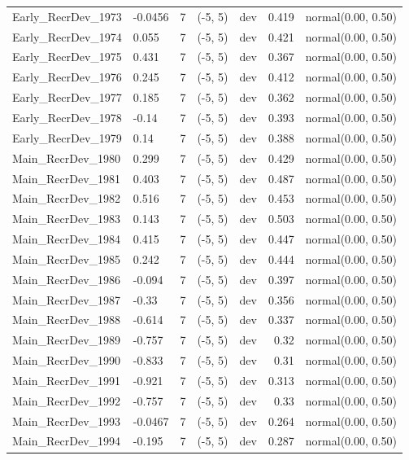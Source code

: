\documentclass[
  english,
]{article}
\begin{document}
\begin{landscape}
\begin{longtable}{llrllrl}
Early\_RecrDev\_1973 & -0.0456 & 7 & (-5, 5) & dev & 0.419 & normal(0.00, 0.50) \\ 
Early\_RecrDev\_1974 & 0.055 & 7 & (-5, 5) & dev & 0.421 & normal(0.00, 0.50) \\ 
Early\_RecrDev\_1975 & 0.431 & 7 & (-5, 5) & dev & 0.367 & normal(0.00, 0.50) \\ 
Early\_RecrDev\_1976 & 0.245 & 7 & (-5, 5) & dev & 0.412 & normal(0.00, 0.50) \\ 
Early\_RecrDev\_1977 & 0.185 & 7 & (-5, 5) & dev & 0.362 & normal(0.00, 0.50) \\ 
Early\_RecrDev\_1978 & -0.14 & 7 & (-5, 5) & dev & 0.393 & normal(0.00, 0.50) \\ 
Early\_RecrDev\_1979 & 0.14 & 7 & (-5, 5) & dev & 0.388 & normal(0.00, 0.50) \\ 
Main\_RecrDev\_1980 & 0.299 & 7 & (-5, 5) & dev & 0.429 & normal(0.00, 0.50) \\ 
Main\_RecrDev\_1981 & 0.403 & 7 & (-5, 5) & dev & 0.487 & normal(0.00, 0.50) \\ 
Main\_RecrDev\_1982 & 0.516 & 7 & (-5, 5) & dev & 0.453 & normal(0.00, 0.50) \\ 
Main\_RecrDev\_1983 & 0.143 & 7 & (-5, 5) & dev & 0.503 & normal(0.00, 0.50) \\ 
Main\_RecrDev\_1984 & 0.415 & 7 & (-5, 5) & dev & 0.447 & normal(0.00, 0.50) \\ 
Main\_RecrDev\_1985 & 0.242 & 7 & (-5, 5) & dev & 0.444 & normal(0.00, 0.50) \\ 
Main\_RecrDev\_1986 & -0.094 & 7 & (-5, 5) & dev & 0.397 & normal(0.00, 0.50) \\ 
Main\_RecrDev\_1987 & -0.33 & 7 & (-5, 5) & dev & 0.356 & normal(0.00, 0.50) \\ 
Main\_RecrDev\_1988 & -0.614 & 7 & (-5, 5) & dev & 0.337 & normal(0.00, 0.50) \\ 
Main\_RecrDev\_1989 & -0.757 & 7 & (-5, 5) & dev & 0.32 & normal(0.00, 0.50) \\ 
Main\_RecrDev\_1990 & -0.833 & 7 & (-5, 5) & dev & 0.31 & normal(0.00, 0.50) \\ 
Main\_RecrDev\_1991 & -0.921 & 7 & (-5, 5) & dev & 0.313 & normal(0.00, 0.50) \\ 
Main\_RecrDev\_1992 & -0.757 & 7 & (-5, 5) & dev & 0.33 & normal(0.00, 0.50) \\ 
Main\_RecrDev\_1993 & -0.0467 & 7 & (-5, 5) & dev & 0.264 & normal(0.00, 0.50) \\ 
Main\_RecrDev\_1994 & -0.195 & 7 & (-5, 5) & dev & 0.287 & normal(0.00, 0.50) \\ 

\end{longtable}
\end{landscape}
\end{document}
